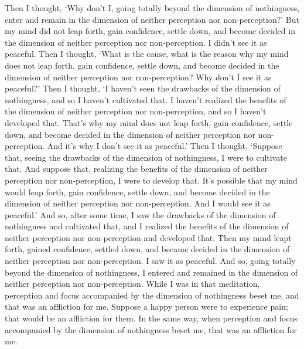 \documentclass[12pt,openany]{book}%
\begin{document}
Then I thought, ‘Why don’t I, going totally beyond the dimension of nothingness, enter and remain in the dimension of neither perception nor non-perception?’ But my mind did not leap forth, gain confidence, settle down, and become decided in the dimension of neither perception nor non-perception. I didn’t see it as peaceful. Then I thought, ‘What is the cause, what is the reason why my mind does not leap forth, gain confidence, settle down, and become decided in the dimension of neither perception nor non-perception? Why don’t I see it as peaceful?’ Then I thought, ‘I haven’t seen the drawbacks of the dimension of nothingness, and so I haven’t cultivated that. I haven’t realized the benefits of the dimension of neither perception nor non-perception, and so I haven’t developed that. That’s why my mind does not leap forth, gain confidence, settle down, and become decided in the dimension of neither perception nor non-perception. And it’s why I don’t see it as peaceful.’ Then I thought, ‘Suppose that, seeing the drawbacks of the dimension of nothingness, I were to cultivate that. And suppose that, realizing the benefits of the dimension of neither perception nor non-perception, I were to develop that. It’s possible that my mind would leap forth, gain confidence, settle down, and become decided in the dimension of neither perception nor non-perception. And I would see it as peaceful.’ And so, after some time, I saw the drawbacks of the dimension of nothingness and cultivated that, and I realized the benefits of the dimension of neither perception nor non-perception and developed that. Then my mind leapt forth, gained confidence, settled down, and became decided in the dimension of neither perception nor non-perception. I saw it as peaceful. And so, going totally beyond the dimension of nothingness, I entered and remained in the dimension of neither perception nor non-perception. While I was in that meditation, perception and focus accompanied by the dimension of nothingness beset me, and that was an affliction for me. Suppose a happy person were to experience pain; that would be an affliction for them. In the same way, when perception and focus accompanied by the dimension of nothingness beset me, that was an affliction for me. 
\end{document}
